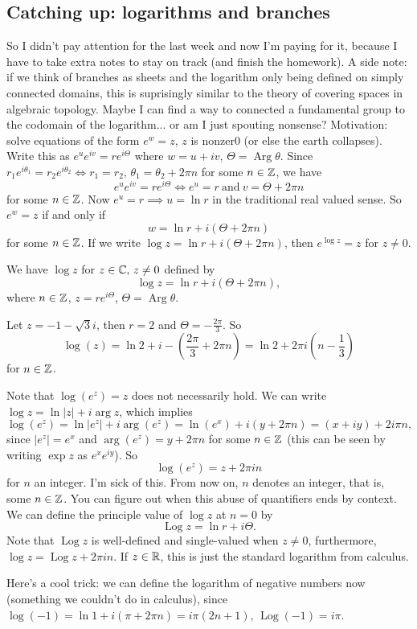 \subsection{Catching up: logarithms and branches}
So I didn't pay attention for the last week and now I'm paying for it, because I have to take extra notes to stay on track (and finish the homework). A side note: if we think of branches as sheets and the logarithm only being defined on simply connected domains, this is suprisingly similar to the theory of covering spaces in algebraic topology. Maybe I can find a way to connected a fundamental group to the codomain of the logarithm... or am I just spouting nonsense?
\orbreak
Motivation: solve equations of the form $e^{w}=z$, $z$ is nonzer0 (or else the earth collapses). Write this as $e^{u}e^{iv}=re^{i\Theta}$ where $w=u+iv$, $\Theta=\operatorname{Arg}\theta$. Since $r_1e^{i\theta_1}=r_2e^{i\theta_2}\iff r_1=r_2,\, \theta_1=\theta_2+2\pi n$ for some $n\in \mathbb{Z}$, we have \[
    e^{u}e^{iv}=re^{i\Theta}\iff e^{u}=r \ \text{and}\ v=\Theta+2\pi n
    \] for some $n\in \mathbb{Z}$. Now $e^{u}=r \implies u=\ln r$ in the traditional real valued sense. So $e^{w}=z$ if and only if \[
    w=\ln r+i(\Theta+2\pi n)
\] for some $n\in \mathbb{Z}$. If we write $\log z=\ln r+i(\Theta +2\pi n)$, then $e^{\log z}=z$ for $z\neq 0$.
\begin{definition}
    We have $\log z$ for $z\in \mathbb{C},\,z\neq 0$ defined by \[
        \log z=\ln r + i(\Theta + 2\pi n),
    \] where $n\in \mathbb{Z}$, $z=re^{i\Theta}$, $\Theta=\operatorname{Arg}\theta$.
\end{definition}
\begin{example}
    Let $z=-1-\sqrt{3}i $, then $r=2$ and $\Theta=-\frac{2\pi}{3}$. So \[
        \log(z)=\ln 2+i-\left( \frac{2\pi}{3}+2\pi n \right) =\ln 2+2\pi i\left( n-\frac{1}{3} \right) 
    \] for $n\in \mathbb{Z}$.
\end{example}
Note that $\log(e^{z})=z$ does not necessarily hold. We can write $\log z= \ln|z| +i \operatorname{arg}z$, which implies \[
    \log(e^{z})=\ln|e^{z}|+i \operatorname{arg}(e^{z})=\ln(e^{x})+i(y+2\pi n )=(x+iy)+2i\pi n,
\] since $|e^{z}|=e^{x}$ and $\operatorname{arg}(e^{z})=y+2\pi n$ for some $n\in \mathbb{Z}$ (this can be seen by writing $\exp z$ as $e^{x}e^{iy}$). So \[
\log(e^{z})=z+2\pi in
\] for $n$ an integer. I'm sick of this. From now on, $n$ denotes an integer, that is, some $n\in \mathbb{Z}$. You can figure out when this abuse of quantifiers ends by context. We can define the principle value of $\log z$ at $n=0$ by \[
\operatorname{Log}z=\ln r+i \Theta.
\] Note that $\operatorname{Log}z$ is well-defined and single-valued when $z\neq 0$, furthermore, $\log z = \operatorname{Log}z+2\pi in$. If $z\in \mathbb{R}$, this is just the standard logarithm from calculus.
\begin{example}
    Here's a cool trick: we can define the logarithm of negative numbers now (something we couldn't do in calculus), since $\log (-1)=\ln 1+i(\pi +2\pi n)=i\pi(2n+1),\, \operatorname{Log}(-1)=i\pi$.
\end{example}
